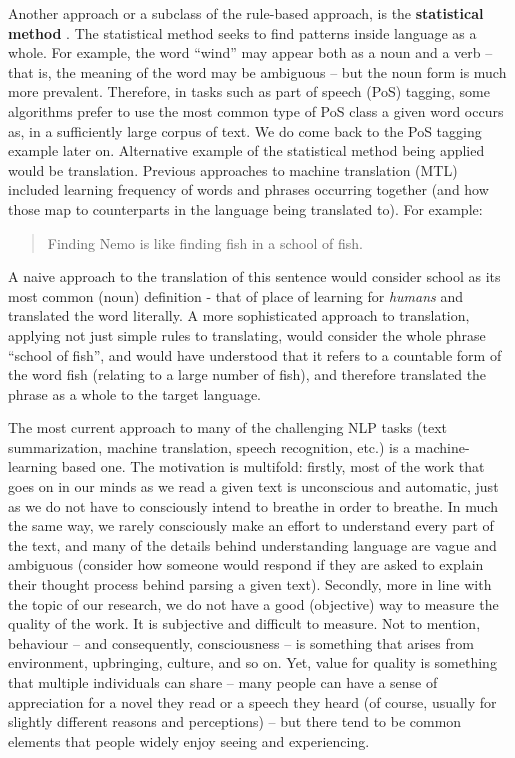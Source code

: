 Another approach or a subclass of the rule-based approach, is the \textbf{statistical method} . The statistical method seeks to find patterns inside language as a whole. For example, the word ``wind'' may appear both as a noun and a verb -- that is, the meaning of the word may be ambiguous -- but the noun form is much more prevalent. Therefore, in tasks such as part of speech (PoS) tagging, some algorithms prefer to use the most common type of PoS class a given word occurs as, in a sufficiently large corpus of text. We do come back to the PoS tagging example later on. Alternative example of the statistical method being applied would be translation. Previous approaches to machine translation (MTL) included learning frequency of words and phrases occurring together (and how those map to counterparts in the language being translated to). For example:
\begin{quotation}
    Finding Nemo is like finding fish in a school of fish.
\end{quotation}
A naive approach to the translation of this sentence would consider school as its most common (noun) definition - that of place of learning for \textit{humans} and translated the word literally. A more sophisticated approach to translation, applying not just simple rules to translating, would consider the whole phrase ``school of fish'', and would have understood that it refers to a countable form of the word fish (relating to a large number of fish), and therefore translated the phrase as a whole to the target language.

The most current approach to many of the challenging NLP tasks (text summarization, machine translation, speech recognition, etc.) is a machine-learning based one. The motivation is multifold: firstly, most of the work that goes on in our minds as we read a given text is unconscious and automatic, just as we do not have to consciously intend to breathe in order to breathe. In much the same way, we rarely consciously make an effort to understand every part of the text, and many of the details behind understanding language are vague and ambiguous (consider how someone would respond if they are asked to explain their thought process behind parsing a given text). Secondly, more in line with the topic of our research, we do not have a good (objective) way to measure the quality of the work. It is subjective and difficult to measure. Not to mention, behaviour -- and consequently, consciousness -- is something that arises from environment, upbringing, culture, and so on. Yet, value for quality is something that multiple individuals can share -- many people can have a sense of appreciation for a novel they read or a speech they heard (of course, usually for slightly different reasons and perceptions) -- but there tend to be common elements that people widely enjoy seeing and experiencing.


